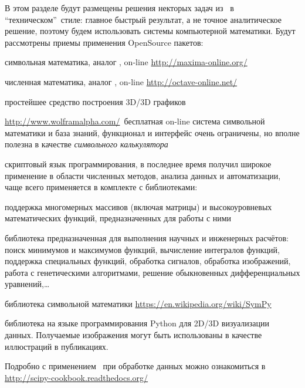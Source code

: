 \secdown

В этом разделе будут размещены решения некторых задач из \cite{danko}\ в
``техническом''\ стиле: главное быстрый результат, а не точное
аналитическое решение, поэтому будем использовать системы компьютерной
математики.
Будут рассмотрены приемы применения OpenSource пакетов:

\begin{description}[nosep]
  \item[\maxima] \cite{maxima} символьная математика, аналог
  , on-line \url{http://maxima-online.org/}
  \item[\octave] \cite{octave} численная математика, аналог ,
  on-line \url{http://octave-online.net/}
  \item[\gnuplot] \cite{gnuplot} простейшее средство построения 3D/3D
  графиков
  \item[\wolfram] \url{http://www.wolframalpha.com/}\ бесплатная on-line
  система символьной математики и база знаний, функционал и интерфейс очень
  ограничены, но вполне полезна в качестве \emph{символьного калькулятора}
  \item[\py] скриптовый язык программирования, в последнее время получил широкое
  применение в области численных методов, анализа данных и автоматизации,
  чаще всего применяется в комплекте с библиотеками:
\begin{description}[nosep]
\item[\prog{NumPy}] поддержка многомерных массивов (включая матрицы) и 
высокоуровневых математических функций, предназначенных для работы с ними
\item[\prog{SciPy}] библиотека предназначенная для выполнения научных и
инженерных расчётов: поиск минимумов и максимумов функций,
вычисление интегралов функций,
поддержка специальных функций,
обработка сигналов,
обработка изображений,
работа с генетическими алгоритмами,
решение обыкновенных дифференциальных уравнений,\ldots
\item[\prog{SymPy}] библиотека символьной
математики \url{https://en.wikipedia.org/wiki/SymPy}
\item[\prog{Matplotlib}] библиотека на языке программирования Python для
2D/3D визуализации данных.
Получаемые изображения могут быть использованы в качестве
иллюстраций в публикациях.
\end{description}
Подробно с применением \py\ при обработке
данных можно ознакомиться в \url{http://scipy-cookbook.readthedocs.org/}
\end{description}

